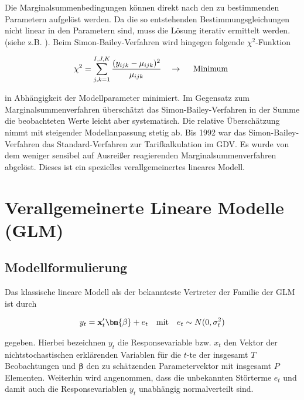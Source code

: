 Die Marginalsummenbedingungen können direkt nach den zu bestimmenden Parametern aufgelöst werden. Da die so entstehenden Bestimmungsgleichungen nicht linear in den Parametern sind, muss die Lösung iterativ ermittelt werden. (siehe z.B. \cite{Mack}). Beim Simon-Bailey-Verfahren wird hingegen folgende  $\chi^2$-Funktion

\begin{eqnarray}
\chi^2 =\sum_{j,k=1}^{I,J,K} \frac{(y_{ijk} - \mu_{ijk})^2}{\mu_{ijk}} \quad \rightarrow \quad \textnormal{ Minimum }
\end{eqnarray}

in Abhängigkeit der Modellparameter minimiert. Im Gegensatz zum Marginalsummenverfahren überschätzt das Simon-Bailey-Verfahren in der Summe die beobachteten Werte leicht aber systematisch. Die relative Überschätzung nimmt mit steigender Modellanpassung stetig ab.
Bis 1992 war das Simon-Bailey-Verfahren das Standard-Verfahren zur Tarifkalkulation im GDV. Es wurde von dem weniger sensibel auf Ausreißer reagierenden Marginalsummenverfahren abgelöst. Dieses ist ein spezielles verallgemeinertes lineares Modell.




\section{Verallgemeinerte Lineare Modelle (GLM)}\label{GLM}  %

\subsection{Modellformulierung}\label{Modellformulierung}

Das klassische lineare Modell als der bekannteste Vertreter der Familie der GLM ist durch

\begin{eqnarray}
y_t = \mathbf{x}_t' \bm{\beta} + e_t \quad \textnormal{mit} \quad e_t \sim N(0,\sigma_t^2)
\end{eqnarray}
	
gegeben. Hierbei bezeichnen $y_t$  die Responsevariable  bzw. $x_t$ den Vektor der nichtstochastischen erklärenden Variablen für die $t$-te der insgesamt $T$ Beobachtungen und $\bm{\beta}$  den zu schätzenden Parametervektor mit insgesamt $P$ Elementen. Weiterhin wird angenommen, dass die unbekannten Störterme $e_t$ und damit auch die Responsevariablen $y_t$  unabhängig normalverteilt sind.

